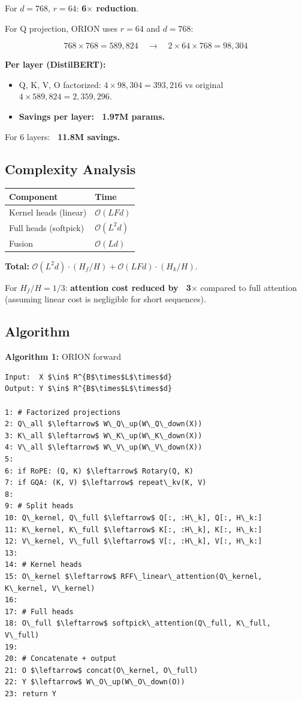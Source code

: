 For $d = 768$, $r = 64$: \textbf{6$\times$ reduction}.

For Q projection, ORION uses $r = 64$ and $d = 768$:

\[
768 \times 768 = 589,824 \quad \rightarrow \quad 2 \times 64 \times 768 = 98,304
\]

\textbf{Per layer (DistilBERT):}
\begin{itemize}
\item Q, K, V, O factorized: $4 \times 98,304 = 393,216$ vs original $4 \times 589,824 = 2,359,296$.
\item \textbf{Savings per layer: ~1.97M params.}

\end{itemize}
For 6 layers: \textbf{~11.8M savings.}

\subsection{Complexity Analysis}

\begin{table}[H]
\centering
\small
\begin{tabular}{ll}
\toprule
\textbf{Component} & \textbf{Time} \\
\midrule
Kernel heads (linear) & $\mathcal{O}(L F d)$ \\
Full heads (softpick) & $\mathcal{O}(L^2 d)$ \\
Fusion & $\mathcal{O}(L d)$ \\
\bottomrule
\end{tabular}
\end{table}

\textbf{Total:} $\mathcal{O}(L^2 d) \cdot (H_f / H) + \mathcal{O}(L F d) \cdot (H_k / H)$.

For $H_f / H = 1/3$: \textbf{attention cost reduced by ~3$\times$} compared to full 
attention (assuming linear cost is negligible for short sequences).

\subsection{Algorithm}

\textbf{Algorithm 1:} ORION forward
\begin{lstlisting}
Input:  X $\in$ R^{B$\times$L$\times$d}
Output: Y $\in$ R^{B$\times$L$\times$d}

1: # Factorized projections
2: Q\_all $\leftarrow$ W\_Q\_up(W\_Q\_down(X))
3: K\_all $\leftarrow$ W\_K\_up(W\_K\_down(X))
4: V\_all $\leftarrow$ W\_V\_up(W\_V\_down(X))
5:
6: if RoPE: (Q, K) $\leftarrow$ Rotary(Q, K)
7: if GQA: (K, V) $\leftarrow$ repeat\_kv(K, V)
8:
9: # Split heads
10: Q\_kernel, Q\_full $\leftarrow$ Q[:, :H\_k], Q[:, H\_k:]
11: K\_kernel, K\_full $\leftarrow$ K[:, :H\_k], K[:, H\_k:]
12: V\_kernel, V\_full $\leftarrow$ V[:, :H\_k], V[:, H\_k:]
13:
14: # Kernel heads
15: O\_kernel $\leftarrow$ RFF\_linear\_attention(Q\_kernel, K\_kernel, V\_kernel)
16:
17: # Full heads
18: O\_full $\leftarrow$ softpick\_attention(Q\_full, K\_full, V\_full)
19:
20: # Concatenate + output
21: O $\leftarrow$ concat(O\_kernel, O\_full)
22: Y $\leftarrow$ W\_O\_up(W\_O\_down(O))
23: return Y
\end{lstlisting}

